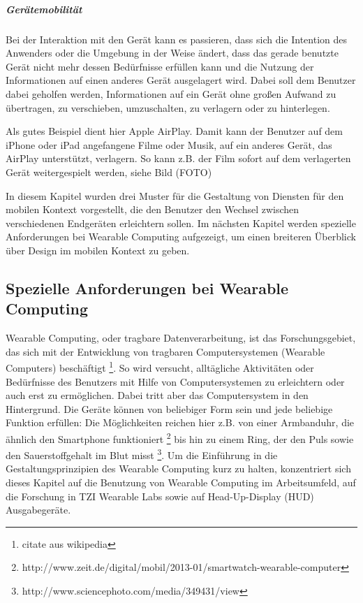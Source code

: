\subparagraph{Gerätemobilität}

Bei der Interaktion mit den Gerät kann es passieren, dass sich die Intention des Anwenders oder die Umgebung in der Weise ändert, dass das gerade benutzte Gerät nicht mehr dessen Bedürfnisse erfüllen kann und die Nutzung der Informationen auf einen anderes Gerät ausgelagert wird. Dabei soll dem Benutzer dabei geholfen werden, Informationen auf ein Gerät ohne großen Aufwand zu übertragen, zu verschieben, umzuschalten, zu verlagern oder zu hinterlegen.

Als gutes Beispiel dient hier Apple AirPlay. Damit kann der Benutzer auf dem iPhone oder iPad angefangene Filme oder Musik, auf ein anderes Gerät, das AirPlay unterstützt, verlagern. So kann z.B. der  Film sofort auf dem verlagerten Gerät weitergespielt werden, siehe Bild (FOTO)
\newline

In diesem Kapitel wurden drei Muster für die Gestaltung von Diensten für den mobilen Kontext vorgestellt, die den Benutzer den Wechsel zwischen verschiedenen  Endgeräten erleichtern sollen. Im nächsten Kapitel werden spezielle Anforderungen bei Wearable Computing aufgezeigt, um einen breiteren Überblick über Design im mobilen Kontext zu geben.

\subsection{Spezielle Anforderungen bei Wearable Computing} 
\label{sub:wearable_computers}


Wearable Computing, oder tragbare Datenverarbeitung, ist das Forschungsgebiet, das sich mit der Entwicklung von tragbaren Computersystemen (Wearable Computers) beschäftigt \footnote{citate aus wikipedia }. So wird versucht, alltägliche Aktivitäten oder Bedürfnisse des Benutzers  mit Hilfe von Computersystemen zu erleichtern oder auch erst zu ermöglichen. Dabei tritt aber das Computersystem in den Hintergrund. Die Geräte können von beliebiger Form sein und jede beliebige Funktion erfüllen: Die Möglichkeiten reichen hier z.B. von einer Armbanduhr, die ähnlich den Smartphone funktioniert \footnote{http://www.zeit.de/digital/mobil/2013-01/smartwatch-wearable-computer} bis hin zu  einem  Ring, der den Puls sowie den Sauerstoffgehalt im Blut misst \footnote{http://www.sciencephoto.com/media/349431/view}.  Um die Einführung in die Gestaltungsprinzipien des Wearable Computing kurz zu halten, konzentriert sich dieses Kapitel auf die Benutzung von Wearable Computing im Arbeitsumfeld, auf die Forschung in TZI Wearable Labs sowie auf Head-Up-Display (HUD) Ausgabegeräte.

